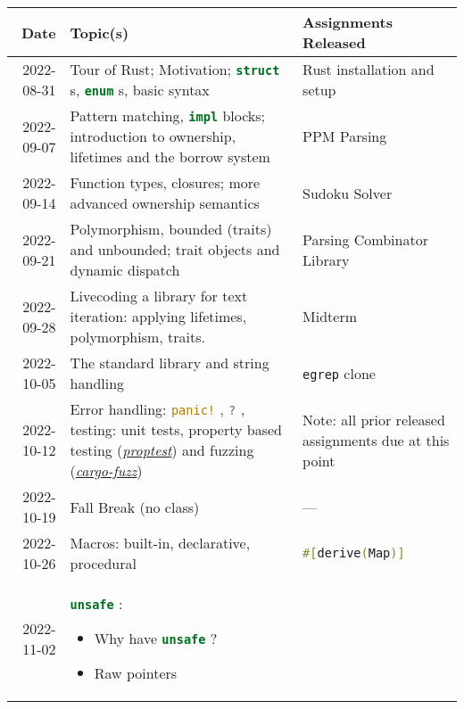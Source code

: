 \documentclass{article}
\newcommand{\code}[2][]{{\sloppy
\ifmmode
\text{\lstinline[language=rust,#1]`#2`}
\else
{\lstinline[language=rust,#1]`#2`}%
\fi}}
\begin{document}
\begin{longtable}{rp{}@{\hskip .05\textwidth}p{}}
    Date        & Topic(s)                          & Assignments Released  \\
    \toprule
    2022-08-31  & Tour of Rust; Motivation;
                  \code{struct}s, \code{enum}s, basic syntax
                & Rust installation and setup                               \\
    2022-09-07  & Pattern matching, \code{impl} blocks; introduction to
                  ownership, lifetimes and the borrow system
                & PPM Parsing                                               \\
    2022-09-14  & Function types, closures; more advanced ownership semantics
                & Sudoku Solver                                             \\
    2022-09-21  & Polymorphism, bounded (traits) and unbounded; trait objects
                  and dynamic dispatch
                & Parsing Combinator Library                                \\
    2022-09-28  & Livecoding a library for text iteration: applying lifetimes,
                  polymorphism, traits.
                & Midterm                                                   \\
    2022-10-05  & The standard library and string handling
                & \texttt{egrep} clone                                      \\
    2022-10-12  & Error handling: \code{panic!}, \code{?}, testing: unit tests,
                  property based testing
                  (\href{https://github.com/AltSysrq/proptest}{\textit{proptest}})
                  and fuzzing
                  (\href{https://github.com/rust-fuzz/cargo-fuzz}{\textit{cargo-fuzz}})
                & Note: all prior released assignments due at this point    \\
    2022-10-19  & Fall Break (no class)
                & ---                                                       \\
    2022-10-26  & Macros: built-in, declarative, procedural
                & \code{#[derive(Map)]}                                     \\
    2022-11-02  & \code{unsafe}: \begin{itemize}
                        \item Why have \code{unsafe}?
                        \item Raw pointers

\end{itemize}
\end{longtable}
\end{document}
